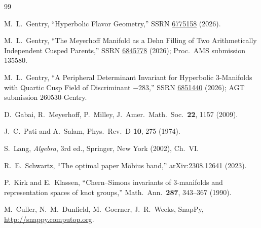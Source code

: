 \documentclass[11pt,a4paper]{article}
\theoremstyle{definition}
\theoremstyle{remark}
\begin{document}
\begin{thebibliography}{99}

M.~L.~Gentry,
``Hyperbolic Flavor Geometry,''
SSRN \href{https://doi.org/10.2139/ssrn.6775158}{6775158} (2026).

M.~L.~Gentry,
``The Meyerhoff Manifold as a Dehn Filling of Two
Arithmetically Independent Cusped Parents,''
SSRN \href{https://doi.org/10.2139/ssrn.6845778}{6845778} (2026);
Proc.\ AMS submission 135580.

M.~L.~Gentry,
``A Peripheral Determinant Invariant for Hyperbolic
3-Manifolds with Quartic Cusp Field of Discriminant $-283$,''
SSRN \href{https://doi.org/10.2139/ssrn.6851440}{6851440} (2026);
AGT submission 260530-Gentry.

D.~Gabai, R.~Meyerhoff, P.~Milley,
J.\ Amer.\ Math.\ Soc.\ \textbf{22}, 1157 (2009).

J.~C.~Pati and A.~Salam,
Phys.\ Rev.\ D \textbf{10}, 275 (1974).

S.~Lang, \textit{Algebra}, 3rd ed.,
Springer, New York (2002), Ch.~VI.

R.~E.~Schwartz,
``The optimal paper M\"obius band,''
arXiv:2308.12641 (2023).

P.~Kirk and E.~Klassen,
``Chern--Simons invariants of 3-manifolds and representation
spaces of knot groups,''
Math.\ Ann.\ \textbf{287}, 343--367 (1990).

M.~Culler, N.~M.~Dunfield, M.~Goerner, J.~R.~Weeks,
SnapPy, \url{http://snappy.computop.org}.

\end{thebibliography}
\end{document}

